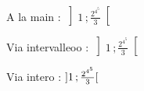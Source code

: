 \documentclass[a4paper,10pt]{article}
\newcommand{\inter}[4]
    {\mathchoice
    {\left#1#2\mathclose{}\mathpunct{};#3\right#4}%
    {\mathopen{#1}#2\mathclose{}\mathpunct{};#3\mathclose{#4}}%
    {\mathopen{#1}#2\mathclose{}\mathpunct{};#3\mathclose{#4}}%
    {\mathopen{#1}#2\mathclose{}\mathpunct{};#3\mathclose{#4}}%
    }
\newcommand{\interoo }[2]{\ensuremath{\inter{]}{#1}{#2}{[}}} %
\newcommand{\intervalleoo}[2]{ \left] #1\,;#2 \right[ }
\begin{document}
	A la main : $\left] 1\, ; \frac{2^{4^5}}{3} \right[$
	
	Via intervalleoo : $\intervalleoo{1}{ \frac{2^{4^5}}{3} }$

	Via intero : $\interoo{1}{ \frac{2^{4^5}}{3} }$
\end{document}
